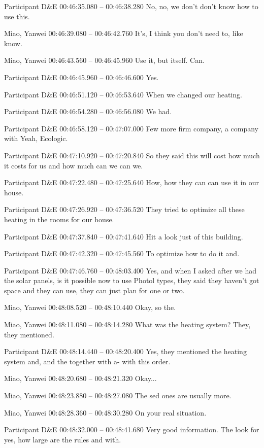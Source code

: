 {Participant D\&E 00:46:35.080 -- 00:46:38.280
No, no, we don't don't know how to use this.

Miao, Yanwei 00:46:39.080 -- 00:46:42.760
It's, I think you don't need to, like know.

Miao, Yanwei 00:46:43.560 -- 00:46:45.960
Use it, but itself. Can.

Participant D\&E 00:46:45.960 -- 00:46:46.600
Yes.

Participant D\&E 00:46:51.120 -- 00:46:53.640
When we changed our heating.

Participant D\&E 00:46:54.280 -- 00:46:56.080
We had.

Participant D\&E 00:46:58.120 -- 00:47:07.000
Few more firm company, a company with Yeah, Ecologic.

Participant D\&E 00:47:10.920 -- 00:47:20.840
So they said this will cost how much it costs for us and how much can we can we.

Participant D\&E 00:47:22.480 -- 00:47:25.640
How, how they can can use it in our house.

Participant D\&E 00:47:26.920 -- 00:47:36.520
They tried to optimize all these heating in the rooms for our house.

Participant D\&E 00:47:37.840 -- 00:47:41.640
Hit a look just of this building.

Participant D\&E 00:47:42.320 -- 00:47:45.560
To optimize how to do it and.

Participant D\&E 00:47:46.760 -- 00:48:03.400
Yes, and when I asked after we had the solar panels, is it possible now to use Photol types, they said they haven't got space and they can use, they can just plan for one or two.

Miao, Yanwei 00:48:08.520 -- 00:48:10.440
Okay, so the.

Miao, Yanwei 00:48:11.080 -- 00:48:14.280
What was the heating system? They, they mentioned.

Participant D\&E 00:48:14.440 -- 00:48:20.400
Yes, they mentioned the heating system and, and the together with a- with this order.

Miao, Yanwei 00:48:20.680 -- 00:48:21.320
Okay...

Miao, Yanwei 00:48:23.880 -- 00:48:27.080
The sed ones are usually more.

Miao, Yanwei 00:48:28.360 -- 00:48:30.280
On your real situation.

Participant D\&E 00:48:32.000 -- 00:48:41.680
Very good information. The look for yes, how large are the rules and with.

}
